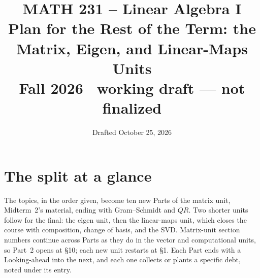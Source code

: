 \documentclass[11pt]{article}
\title{\vspace{-1.2cm}\textbf{\sffamily MATH 231 -- Linear Algebra I}\\[4pt]
       {\large\sffamily Plan for the Rest of the Term: the Matrix, Eigen,
        and Linear-Maps Units}\\[2pt]
       {\normalsize\sffamily Fall 2026 \textbullet\ working draft --- not finalized}}
\author{}
\date{\normalsize\sffamily Drafted October 25, 2026}
\begin{document}
\maketitle
\vspace{-1.0cm}

\begin{center}
\end{center}

\section{The split at a glance}
The topics, in the order given, become ten new Parts of the matrix unit,
Midterm~2's material, ending with Gram--Schmidt and $QR$. Two shorter units
follow for the final: the eigen unit, then the linear-maps unit, which closes
the course with composition, change of basis, and the SVD. Matrix-unit section
numbers continue across Parts as they do in the vector and computational units,
so Part~2 opens at \S10; each new unit restarts at \S1. Each Part ends with a
Looking-ahead into the next, and each one collects or plants a specific debt,
noted under its entry.
\end{document}
